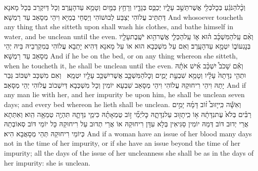 {וְכׇ֨ל\maqqaf הַנֹּגֵ֔עַ בְּכׇל\maqqaf כְּלִ֖י אֲשֶׁר\maqqaf תֵּשֵׁ֣ב עָלָ֑יו יְכַבֵּ֧ס בְּגָדָ֛יו וְרָחַ֥ץ בַּמַּ֖יִם וְטָמֵ֥א עַד\maqqaf הָעָֽרֶב׃}
{וְכָל דְּיִקְרַב בְּכָל מָאנָא דְּתִתֵּיב עֲלוֹהִי יְצַבַּע לְבוּשׁוֹהִי וְיַסְחֵי בְמַיָּא וִיהֵי מְסָאַב עַד רַמְשָׁא׃}
{And whosoever toucheth any thing that she sitteth upon shall wash his clothes, and bathe himself in water, and be unclean until the even.}{}
{וְאִ֨ם עַֽל\maqqaf הַמִּשְׁכָּ֜ב ה֗וּא א֧וֹ עַֽל\maqqaf הַכְּלִ֛י אֲשֶׁר\maqqaf הִ֥וא יֹשֶֽׁבֶת\maqqaf עָלָ֖יו בְּנׇגְעוֹ\maqqaf ב֑וֹ יִטְמָ֖א עַד\maqqaf הָעָֽרֶב׃}
{וְאִם עַל מִשְׁכְּבָא הוּא אוֹ עַל מָאנָא דְּהִיא יָתְבָא עֲלוֹהִי בְּמִקְרְבֵיהּ בֵּיהּ יְהֵי מְסָאַב עַד רַמְשָׁא׃}
{And if he be on the bed, or on any thing whereon she sitteth, when he toucheth it, he shall be unclean until the even.}{}
{וְאִ֡ם שָׁכֹב֩ יִשְׁכַּ֨ב אִ֜ישׁ אֹתָ֗הּ וּתְהִ֤י נִדָּתָהּ֙ עָלָ֔יו וְטָמֵ֖א שִׁבְעַ֣ת יָמִ֑ים וְכׇל\maqqaf הַמִּשְׁכָּ֛ב אֲשֶׁר\maqqaf יִשְׁכַּ֥ב עָלָ֖יו יִטְמָֽא׃ \setuma }
{וְאִם מִשְׁכָּב יִשְׁכּוֹב גְּבַר יָתַהּ וִיהֵי רִיחוּקַהּ עֲלוֹהִי וִיהֵי מְסָאַב שִׁבְעָא יוֹמִין וְכָל מִשְׁכְּבָא דְּיִשְׁכוֹב עֲלוֹהִי יְהֵי מְסָאַב׃}
{And if any man lie with her, and her impurity be upon him, he shall be unclean seven days; and every bed whereon he lieth shall be unclean.}{}
{וְאִשָּׁ֡ה כִּֽי\maqqaf יָזוּב֩ ז֨וֹב דָּמָ֜הּ יָמִ֣ים רַבִּ֗ים בְּלֹא֙ עֶת\maqqaf נִדָּתָ֔הּ א֥וֹ כִֽי\maqqaf תָז֖וּב עַל\maqqaf נִדָּתָ֑הּ כׇּל\maqqaf יְמֵ֞י ז֣וֹב טֻמְאָתָ֗הּ כִּימֵ֧י נִדָּתָ֛הּ תִּהְיֶ֖ה טְמֵאָ֥ה הִֽוא׃}
{וְאִתְּתָא אֲרֵי יְדוּב דּוֹב דְּמַהּ יוֹמִין סַגִּיאִין בְּלָא עִדָּן רִיחוּקַהּ אוֹ אֲרֵי תְדוּב עַל רִיחוּקַהּ כָּל יוֹמֵי דּוֹב סְאוֹבְתַהּ כְּיוֹמֵי רִיחוּקַהּ תְּהֵי מְסָאֲבָא הִיא׃}
{And if a woman have an issue of her blood many days not in the time of her impurity, or if she have an issue beyond the time of her impurity; all the days of the issue of her uncleanness she shall be as in the days of her impurity: she is unclean.}{}
